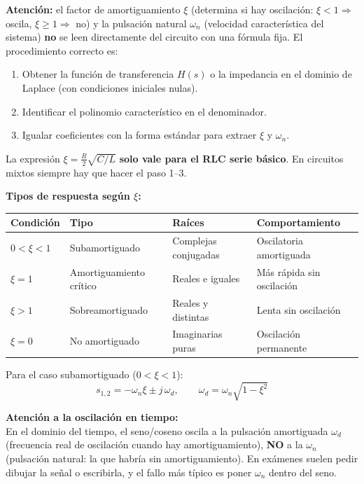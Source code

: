 \documentclass[12pt,a4paper]{article}
\begin{document}
\begin{warnbox}
\textbf{\color{warnorangeline}Atención:} el factor de amortiguamiento $\xi$ (determina si hay oscilación: $\xi < 1 \Rightarrow$ oscila, $\xi \geq 1 \Rightarrow$ no) y la pulsación natural $\omega_n$ (velocidad característica del sistema) \textbf{no} se leen
directamente del circuito con una fórmula fija. El procedimiento correcto es:
\begin{enumerate}[leftmargin=2.5em, itemsep=3pt]
  \item Obtener la función de transferencia $H(s)$ o la impedancia en el dominio de
        Laplace (con condiciones iniciales nulas).
  \item Identificar el polinomio característico en el denominador.
  \item Igualar coeficientes con la forma estándar para extraer $\xi$ y $\omega_n$.
\end{enumerate}
La expresión $\xi = \tfrac{R}{2}\sqrt{C/L}$ \textbf{solo vale para el RLC serie básico}.
En circuitos mixtos siempre hay que hacer el paso 1--3.
\end{warnbox}

\medskip
\textbf{Tipos de respuesta según $\xi$:}

\begin{center}
\renewcommand{\arraystretch}{1.4}
\begin{tabular}{llll}
\toprule
\textbf{Condición} & \textbf{Tipo} & \textbf{Raíces} & \textbf{Comportamiento}\\
\midrule
$0 < \xi < 1$ & Subamortiguado    & Complejas conjugadas & Oscilatoria amortiguada\\
$\xi = 1$     & Amortiguamiento crítico & Reales e iguales & Más rápida sin oscilación\\
$\xi > 1$     & Sobreamortiguado  & Reales y distintas   & Lenta sin oscilación\\
$\xi = 0$     & No amortiguado    & Imaginarias puras    & Oscilación permanente\\
\bottomrule
\end{tabular}
\end{center}

Para el caso subamortiguado ($0 < \xi < 1$):
\[
  s_{1,2} = -\omega_n\xi \pm j\,\omega_d, \qquad \omega_d = \omega_n\sqrt{1-\xi^2}
\]

\begin{warnbox}
\textbf{\color{warnorangeline}Atención a la oscilación en tiempo:}\\[4pt]
En el dominio del tiempo, el seno/coseno oscila a la pulsación amortiguada $\omega_d$ (frecuencia real de oscilación cuando hay amortiguamiento),
\textbf{NO} a la $\omega_n$ (pulsación natural: la que habría sin amortiguamiento). En exámenes suelen pedir
dibujar la señal o escribirla, y el fallo más típico es poner $\omega_n$ dentro
del seno.
\end{warnbox}
\end{document}

